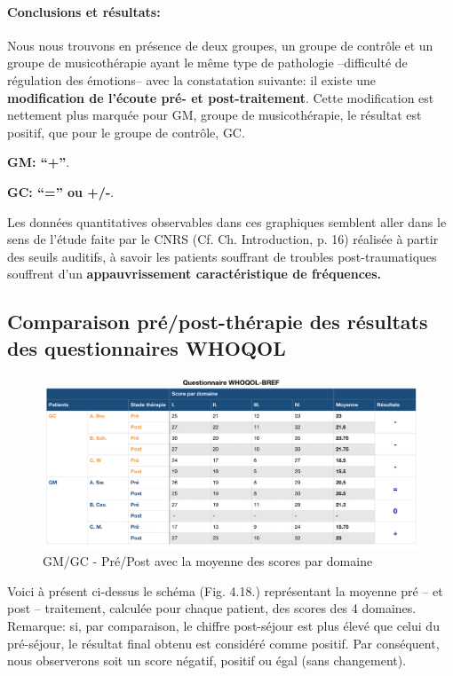 \paragraph{ Conclusions et résultats:}

             Nous nous trouvons
           en présence de deux groupes, un groupe de contrôle et un
           groupe de musicothérapie ayant le même type de
           pathologie --difficulté de régulation des émotions-- avec la constatation suivante: il existe
          une \textbf{modification de l'écoute pré- et post-traitement}.
          Cette modification est nettement plus marquée
          pour GM, groupe de musicothérapie, le résultat est positif, que pour le groupe de contrôle, GC.

          \textbf{GM: ``+''}.


          \textbf{GC:  ``='' ou +/-}.


        Les données quantitatives observables dans ces graphiques semblent aller dans le
sens de  l'étude faite par le
CNRS (Cf. Ch. Introduction, p. 16) \autocite{affectiveDisorders} réalisée à partir des seuils auditifs, à savoir
les patients souffrant de troubles post-traumatiques souffrent d'un
\textbf{appauvrissement caractéristique de fréquences.}


\subsection{ Comparaison pré/post-thérapie des résultats des
  questionnaires WHOQOL}

\begin{figure}[tbh]
\centering
\includegraphics[width=1.2\linewidth]{images/graphiques/questionnaire_wq.png}
\caption[Questionnaire WHOQOL-BREF]{GM/GC - Pré/Post avec la moyenne des scores par domaine}

\end{figure}
Voici à présent ci-dessus le schéma (Fig. 4.18.) représentant la
moyenne pré -- et post -- traitement, calculée pour chaque patient, des scores
des 4 domaines.
Remarque: si, par comparaison, le chiffre post-séjour est plus élevé
que celui du
pré-séjour, le résultat final obtenu est considéré comme
positif. Par conséquent, nous
observerons soit un score négatif, positif ou égal (sans changement).


